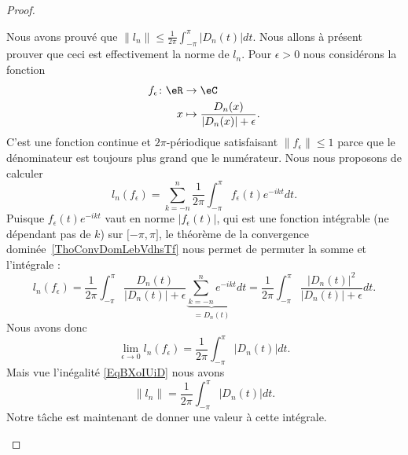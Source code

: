 \begin{proof}
\begin{subproof}
		Nous avons prouvé que \( \| l_n \|\leq \frac{1}{ 2\pi }\int_{-\pi}^{\pi}| D_n(t) |dt\). Nous allons à présent prouver que ceci est effectivement la norme de \( l_n\). Pour \( \epsilon>0\) nous considérons la fonction
		\begin{equation}
			\begin{aligned}
				f_{\epsilon}\colon \eR & \to \eC                                         \\
				x                      & \mapsto \frac{ D_n(x) }{ | D_n(x) |+\epsilon }.
			\end{aligned}
		\end{equation}
		C'est une fonction continue et \( 2\pi\)-périodique satisfaisant \( \| f_{\epsilon} \|\leq 1\) parce que le dénominateur est toujours plus grand que le numérateur. Nous nous proposons de calculer
		\begin{equation}
			l_n(f_{\epsilon})=\sum_{k=-n}^n\frac{1}{ 2\pi }\int_{-\pi}^{\pi}f_{\epsilon}(t) e^{-ikt}dt.
		\end{equation}
		Puisque \( f_{\epsilon}(t) e^{-ikt}\) vaut en norme \( | f_{\epsilon}(t) |\), qui est une fonction intégrable (ne dépendant pas de \( k\)) sur \( \mathopen[ -\pi , \pi \mathclose]\), le théorème de la convergence dominée~\ref{ThoConvDomLebVdhsTf} nous permet de permuter la somme et l'intégrale :
		\begin{equation}
			l_n(f_{\epsilon})=\frac{1}{ 2\pi }\int_{-\pi}^{\pi}\frac{ D_n(t) }{ | D_n(t) |+\epsilon }\underbrace{\sum_{k=-n}^n e^{-ikt}}_{=D_n(t)}dt=\frac{1}{ 2\pi }\int_{-\pi}^{\pi}\frac{ \big| D_n(t) \big|^2 }{ | D_n(t) |+\epsilon }dt.
		\end{equation}
		Nous avons donc
		\begin{equation}
			\lim_{\epsilon\to 0}l_n(f_{\epsilon})=\frac{1}{ 2\pi }\int_{-\pi}^{\pi}| D_n(t) |dt.
		\end{equation}
		Mais vue l'inégalité \eqref{EqBXoIUiD} nous avons
		\begin{equation}
			\| l_n \|=\frac{1}{ 2\pi }\int_{-\pi}^{\pi}| D_n(t) |dt.
		\end{equation}
		Notre tâche est maintenant de donner une valeur à cette intégrale.


\end{subproof}
\end{proof}
